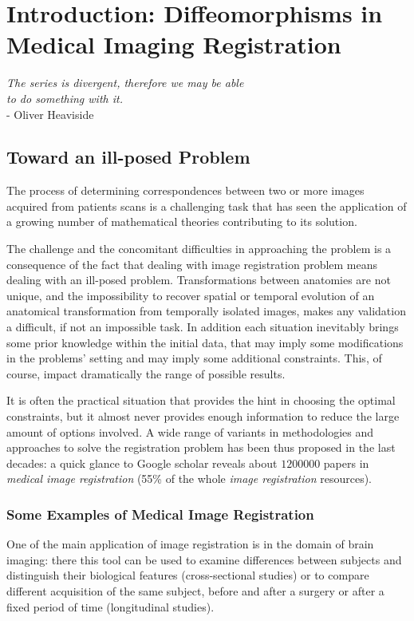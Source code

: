 \chapter{Introduction: Diffeomorphisms in Medical Imaging Registration}\label{ch:introduction}


\begin{flushright}
		\emph{The series is divergent, therefore we may be able \\ to do something with it.}\\
			- Oliver Heaviside
\end{flushright}

\vspace{0.6cm}


\section{Toward an ill-posed Problem}
The process of determining correspondences between two or more images acquired from patients scans is a challenging task that has seen the application of a growing number of mathematical theories contributing to its solution.

The challenge and the concomitant difficulties in approaching the problem is a consequence of the fact that dealing with image registration problem means dealing with an ill-posed problem. Transformations between anatomies are not unique, and the impossibility to recover spatial or temporal evolution of an anatomical transformation from temporally isolated images, makes any validation a difficult, if not an impossible task. 
In addition each situation inevitably brings some prior knowledge within the initial data, that may imply some modifications in the problems' setting and may imply some additional constraints. This, of course, impact dramatically the range of possible results. 

It is often the practical situation that provides the hint in choosing the optimal constraints, but it almost never provides enough information to reduce the large amount of options involved. A wide range of variants in methodologies and approaches to solve the registration problem has been thus proposed in the last decades: a quick glance to Google scholar reveals about $1200000$ papers in \emph{medical image registration} (55\% of the whole \emph{image registration} resources). 

\subsection{Some Examples of Medical Image Registration}
One of the main application of image registration is in the domain of brain imaging: there this tool can be used to examine differences between subjects and distinguish their biological features (cross-sectional studies) or to compare different acquisition of the same subject, before and after a surgery or after a fixed period of time (longitudinal studies). 

